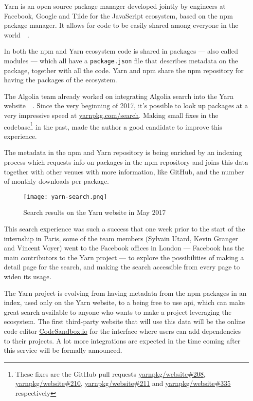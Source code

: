 Yarn is an open source package manager developed jointly by engineers at Facebook, Google and Tilde for the JavaScript ecosystem, based on the npm package manager. It allows for code to be easily shared among everyone in the world~\cite{yarn-site}~.

In both the npm and Yarn ecosystem code is shared in packages --- also called modules --- which all have a {\tt package.json} file that describes metadata on the package, together with all the code. Yarn and npm share the npm repository for having the packages of the ecosystem.

The Algolia team already worked on integrating Algolia search into the Yarn website~\cite{yarn-pr-add-algolia}~. Since the very beginning of 2017, it's possible to look up packages at a very impressive speed at \href{https://yarnpkg.com/search}{yarnpkg.com/search}. Making small fixes in the codebase\footnote{These fixes are the GitHub pull requests \href{https://github.com/yarnpkg/website/pulls/208}{yarnpkg/website\#208}, \href{https://github.com/yarnpkg/website/pulls/210}{yarnpkg/website\#210}, \href{https://github.com/yarnpkg/website/pulls211}{yarnpkg/website\#211} and \href{https://github.com/yarnpkg/website/pulls/335}{yarnpkg/website\#335} respectively} in the past, made the author a good candidate to improve this experience.

The metadata in the npm and Yarn repository is being enriched by an indexing process\cite{npm-search} which requests info on packages in the npm repository and joins this data together with other venues with more information, like GitHub, and the number of monthly downloads per package.

\begin{figure}[H]
  \centering
  \texttt{[image: yarn-search.png]}
  \caption{Search results on the Yarn website in May 2017}
  \label{figure:yarn-search}
\end{figure}

This search experience was such a success that one week prior to the start of the internship in Paris, some of the team members (Sylvain Utard, Kevin Granger and Vincent Voyer) went to the Facebook offices in London --- Facebook has the main contributors to the Yarn project --- to explore the possibilities of making a detail page for the search, and making the search accessible from every page to widen its usage.

The Yarn project is evolving from having metadata from the npm packages in an index, used only on the Yarn website, to a being free to use \acrshort{api}, which can make great search available to anyone who wants to make a project leveraging the ecosystem. The first third-party website that will use this data will be the online code editor \href{https://codesandbox.io}{CodeSandbox.io} for the interface where users can add dependencies to their projects. A lot more integrations are expected in the time coming after this service will be formally announced.

